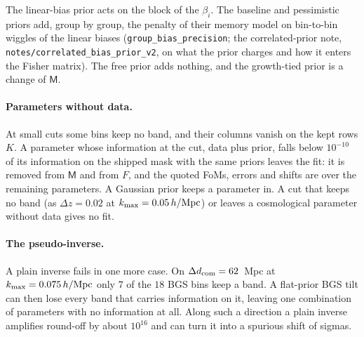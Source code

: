 \documentclass[11pt]{article}
\newcommand{\kmax}{k_{\rm max}}
\newcommand{\hMpc}{\,h/{\rm Mpc}}
\newcommand{\mM}{\mathsf{M}}
\newcommand{\us}{\_\allowbreak}
\begin{document}
The linear-bias prior acts on the block of the $\beta_i$.  The baseline
and pessimistic priors add, group by group, the penalty of their memory
model on bin-to-bin wiggles of the linear biases
(\texttt{group\us bias\us precision}; the correlated-prior note,
\texttt{notes/correlated\us bias\us prior\us v2}, on what the prior
charges and how it enters the Fisher matrix).  The free prior adds
nothing, and the growth-tied
prior is a change of $\mM$.

\paragraph{Parameters without data.}
At small cuts some bins keep no band, and their columns vanish on
the kept rows $K$.  A parameter whose information at the cut, data plus prior,
falls below $10^{-10}$ of its information on the shipped mask with the
same priors leaves the fit: it is removed from $\mM$ and from $F$, and
the quoted FoMs, errors and shifts are over the remaining parameters.
A Gaussian prior keeps a parameter in.  A cut that
keeps no band (as $\Delta z = 0.02$ at $\kmax = 0.05\hMpc$) or leaves a
cosmological parameter without data gives no fit.

\paragraph{The pseudo-inverse.}
A plain inverse fails in one more case.  On
$\Delta d_{\rm com} = 62$~Mpc at $\kmax = 0.075\hMpc$ only $7$ of the
$18$ BGS bins keep a band.  A flat-prior BGS tilt can then lose every
band that carries information on it, leaving one combination of
parameters with no information at all.  Along such a direction a plain
inverse amplifies round-off by about $10^{16}$ and can turn it into a
spurious shift of sigmas.
\end{document}
